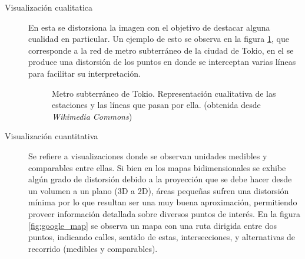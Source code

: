 \documentclass[12pt]{article}
\begin{document}
	\begin{description}		
		\item[Visualización cualitatica] En esta se distorsiona la imagen con el objetivo de destacar alguna cualidad en particular. Un ejemplo de esto se observa en la figura \ref{fig:metro}, que corresponde a la red de metro subterráneo de la ciudad de Tokio, en el se produce una distorsión de los puntos en donde se interceptan varias líneas para facilitar su interpretación. 
		
\begin{figure}[h] %
\caption[Metro subterráneo de Tokio]{Metro subterráneo de Tokio. Representación cualitativa de las estaciones y las líneas que pasan por ella. (obtenida desde \textit{Wikimedia Commons})}
\label{fig:metro}
\end{figure}

		\item[Visualización cuantitativa] Se refiere a visualizaciones donde se observan unidades medibles y comparables entre ellas. Si bien en los mapas bidimensionales se exhibe algún grado de distorsión debido a la proyección que se debe hacer desde un volumen a un plano (3D a 2D), áreas pequeñas sufren una distorsión mínima por lo que resultan ser una muy buena aproximación, permitiendo proveer información detallada sobre diversos puntos de interés. En la figura \ref{fig:google_map} se observa un mapa con una ruta dirigida entre dos puntos, indicando calles, sentido de estas, intersecciones, y alternativas de recorrido (medibles y comparables).
		

\end{description}
\end{document}

